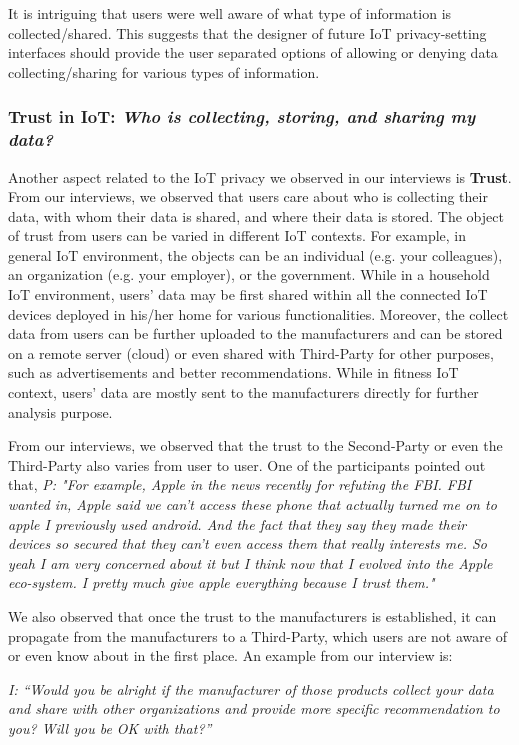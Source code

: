 It is intriguing that users were well aware of what type of information is collected/shared. This suggests that the designer of future IoT privacy-setting interfaces should provide the user separated options of allowing or denying data collecting/sharing for various types of information.

\subsubsection{Trust in IoT: \textit{Who is collecting, storing, and sharing my data?}}
Another aspect related to the IoT privacy we observed in our interviews is \textbf{Trust}. From our interviews, we observed that users care about who is collecting their data, with whom their data is shared, and where their data is stored. The object of trust from users can be varied in different IoT contexts. For example, in general IoT environment, the objects can be an individual (e.g. your colleagues), an organization (e.g. your employer), or the government. While in a household IoT environment, users' data may be first shared within all the connected IoT devices deployed in his/her home for various functionalities. Moreover, the collect data from users can be further uploaded to the manufacturers and can be stored on a remote server (cloud) or even shared with Third-Party for other purposes, such as advertisements and better recommendations. While in fitness IoT context, users' data are mostly sent to the manufacturers directly for further analysis purpose.

From our interviews, we observed that the trust to the Second-Party or even the Third-Party also varies from user to user. One of the participants pointed out that, \textit{P: "For example, Apple in the news recently for refuting the FBI. FBI wanted in, Apple said we can't access these phone that actually turned me on to apple I previously used android. And the fact that they say they made their devices so secured that they can't even access them that really interests me. So yeah I am very concerned about it but I think now that I evolved into the Apple eco-system. I pretty much give apple everything because I trust them."}



We also observed that once the trust to the manufacturers is established, it can propagate from the manufacturers to a Third-Party, which users are not aware of or even know about in the first place. An example from our interview is:

\textit{I: ``Would you be alright if the manufacturer of those products collect your data and share with other organizations and provide more specific recommendation to you? Will you be OK with that?''\\}

